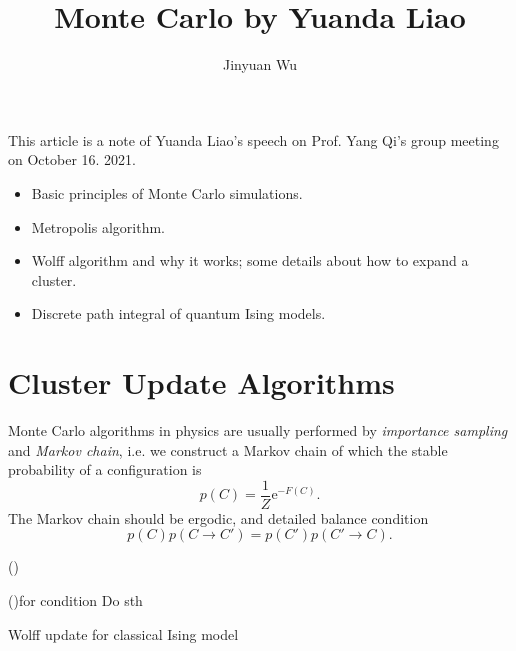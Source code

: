 \documentclass[hyperref, a4paper]{article}
\title{Monte Carlo by Yuanda Liao}
\author{Jinyuan Wu}
\newcommand*{\ee}{\mathrm{e}}
\begin{document}
\maketitle

This article is a note of Yuanda Liao's speech on Prof. Yang Qi's group meeting on October 16. 2021.

\begin{itemize}
    \item Basic principles of Monte Carlo simulations.
    \item Metropolis algorithm.
    \item Wolff algorithm and why it works; some details about how to expand a cluster.
    \item Discrete path integral of quantum Ising models.
\end{itemize}

\section{Cluster Update Algorithms}

Monte Carlo algorithms in physics are usually performed by \emph{importance sampling} and \emph{Markov chain}, i.e. we construct a Markov chain of which the stable probability of a configuration is 
\begin{equation}
    p(C) = \frac{1}{Z} \ee^{- F(C)}.
\end{equation}
The Markov chain should be ergodic, and detailed balance condition
\begin{equation}
    p(C) p(C \to C') = p(C') p(C' \to C).
\end{equation}

\begin{algorithm}

    \DontPrintSemicolon
    \SetAlgoLined
  
    \Function(){}{
  
    \For(){for condition}{
      Do sth 
    }
  
    
    \;
    }
    
    \caption{Wolff update for classical Ising model}
    \label{alg:basic-kohn-sham}
\end{algorithm}
\end{document}
